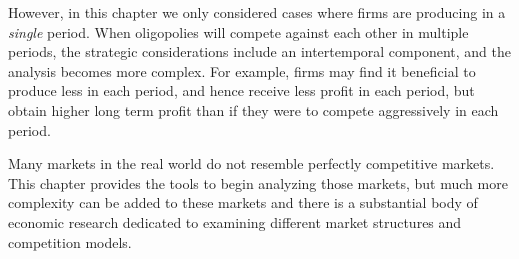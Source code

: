 However, in this chapter we only considered cases where firms are producing in a \emph{single} period. When oligopolies will compete against each other in multiple periods, the strategic considerations include an intertemporal component, and the analysis becomes more complex. For example, firms may find it beneficial to produce less in each period, and hence receive less profit in each period, but obtain higher long term profit than if they were to compete aggressively in each period. 

Many markets in the real world do not resemble perfectly competitive markets. This chapter provides the tools to begin analyzing those markets, but much more complexity can be added to these markets and there is a substantial body of economic research dedicated to examining different market structures and competition models.
